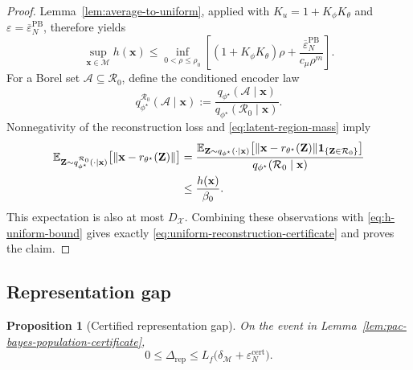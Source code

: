 \documentclass[pdflatex,sn-mathphys-num]{sn-jnl}%
\theoremstyle{thmstyleone}%
\newtheorem{proposition}[theorem]{Proposition}%
\theoremstyle{thmstyletwo}%
\theoremstyle{thmstylethree}%
\begin{document}
\begin{appendices}
\begin{proof}
Lemma~\ref{lem:average-to-uniform}, applied with $K_u=1+K_\phi K_\theta$ and $\varepsilon=\overline\varepsilon_N^{\mathrm{PB}}$, therefore yields
\begin{equation}
  \sup_{\mathbf{x}\in\mathcal{M}}h(\mathbf{x})
  \leq
  \inf_{0<\rho\leq\rho_0}
  \left[
    (1+K_\phi K_\theta)\rho
    +\frac{\overline\varepsilon_N^{\mathrm{PB}}}
           {c_\mu\rho^m}
  \right].
  \label{eq:h-uniform-bound}
\end{equation}
For a Borel set $\mathcal{A}\subseteq\mathcal{R}_0$, define the conditioned encoder law
\begin{equation}
  q_{\phi^\star}^{\mathcal{R}_0}(\mathcal{A}\mid\mathbf{x})
  :=\frac{q_{\phi^\star}(\mathcal{A}\mid\mathbf{x})}
          {q_{\phi^\star}(\mathcal{R}_0\mid\mathbf{x})}.
  \label{eq:conditioned-encoder}
\end{equation}
Nonnegativity of the reconstruction loss and \eqref{eq:latent-region-mass} imply
\begin{align}
  \mathbb{E}_{\mathbf{Z}\sim
    q_{\phi^\star}^{\mathcal{R}_0}(\cdot\mid\mathbf{x})}
    \bigl[\|\mathbf{x}-r_{\theta^\star}(\mathbf{Z})\|\bigr]
  &=
  \frac{
    \mathbb{E}_{\mathbf{Z}\sim q_{\phi^\star}(\cdot\mid\mathbf{x})}
      \bigl[\|\mathbf{x}-r_{\theta^\star}(\mathbf{Z})\|
        \mathbf{1}_{\{\mathbf{Z}\in\mathcal{R}_0\}}\bigr]
  }{q_{\phi^\star}(\mathcal{R}_0\mid\mathbf{x})}
  \notag\\
  &\leq \frac{h(\mathbf{x})}{\beta_0}.
  \label{eq:conditioning-penalty}
\end{align}
This expectation is also at most $D_{\mathcal{X}}$.  Combining these observations with \eqref{eq:h-uniform-bound} gives exactly \eqref{eq:uniform-reconstruction-certificate} and proves the claim.
\end{proof}

\subsection{Representation gap}

\begin{proposition}[Certified representation gap]
\label{prop:certified-representation-gap}
On the event in Lemma~\ref{lem:pac-bayes-population-certificate},
\begin{equation}
  0\leq\Delta_{\mathrm{rep}}
  \leq L_f\bigl(\delta_{\mathcal{M}}
                 +\varepsilon_N^{\mathrm{cert}}\bigr).
  \label{eq:certified-representation-gap}
\end{equation}
\end{proposition}


\end{appendices}
\end{document}
